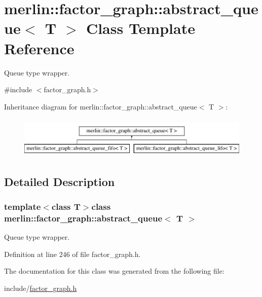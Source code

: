 \hypertarget{classmerlin_1_1factor__graph_1_1abstract__queue}{}\section{merlin\+:\+:factor\+\_\+graph\+:\+:abstract\+\_\+queue$<$ T $>$ Class Template Reference}
\label{classmerlin_1_1factor__graph_1_1abstract__queue}


Queue type wrapper.  




{\ttfamily \#include $<$factor\+\_\+graph.\+h$>$}

Inheritance diagram for merlin\+:\+:factor\+\_\+graph\+:\+:abstract\+\_\+queue$<$ T $>$\+:\begin{figure}[H]
\begin{center}
\leavevmode
\includegraphics[height=1.992882cm]{classmerlin_1_1factor__graph_1_1abstract__queue}
\end{center}
\end{figure}


\subsection{Detailed Description}
\subsubsection*{template$<$class T$>$class merlin\+::factor\+\_\+graph\+::abstract\+\_\+queue$<$ T $>$}

Queue type wrapper. 

Definition at line 246 of file factor\+\_\+graph.\+h.



The documentation for this class was generated from the following file\+:\begin{DoxyCompactItemize}
\item 
include/\hyperlink{factor__graph_8h}{factor\+\_\+graph.\+h}\end{DoxyCompactItemize}

